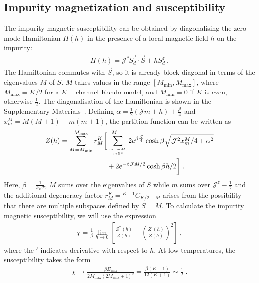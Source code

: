 \documentclass{iopart}
\begin{document}
\subsection{Impurity magnetization and susceptibility}
\label{sec:imp_suscept}
The impurity magnetic susceptibility can be obtained by diagonalising the zero-mode Hamiltonian \(H(h)\) in the presence of a local magnetic field \(h\) on the impurity:
\begin{eqnarray}
	\label{star graph_field_hamiltonian}
	H(h) = {\mathcal{J}^*} \vec{S_d}\cdot\vec{S} + h S_d^z~.
\end{eqnarray}
The Hamiltonian commutes with \(\vec S\), so it is already block-diagonal in terms of the eigenvalues \(M\) of \(S\). \(M\) takes values in the range \(\left[M_\mathrm{min}, M_\mathrm{max}\right]\), where \(M_\mathrm{max} = K/2\) for a \(K-\)channel Kondo model, and \(M_\mathrm{min} = 0\)  if \(K\) is even, otherwise \(\frac{1}{2}\). The diagonalisation of the Hamiltonian is shown in the Supplementary Materials~\cite{SM}. Defining \(\alpha = \frac{1}{2}\left({\mathcal{J}}m + h\right) + \frac{{\mathcal{J}}}{4}\) and \(x^M_m = M(M+1) - m(m+1)\), the partition function can be written as
\begin{eqnarray}
	Z(h) =\sum_{M=M_\mathrm{min}}^{M_\mathrm{max}}r^K_M\bigg[&\sum_{m=-M, \atop{m\in \mathbb{Z}}}^{M-1}2e^{\beta \frac{{\mathcal{J}}}{4}}\cosh \beta\sqrt{{\mathcal{J}}^2x^M_m/4 + \alpha^2} \nonumber\\
& + 2e^{-\beta {\mathcal{J}}M/2}\cosh \beta h/2\bigg]~.
\end{eqnarray}
Here, \(\beta = \frac{1}{k_B T}\), \(M\) sums over the eigenvalues of \(S\) while \(m\) sums over \({\mathcal{J}}^z - \frac{1}{2}\) and the additional degeneracy factor \(r^K_M= {}^{K-1}C_{K/2 - M}\) arises from the possibility that there are multiple subspaces defined by \(S=M\). 
To calculate the impurity magnetic susceptibility, we will use the expression
\begin{eqnarray}
	\chi = \frac{1}{\beta}\lim_{h \to 0}\left[\frac{Z^{\prime\prime}(h)}{Z(h)} - \left(\frac{Z^{\prime}(h)}{Z(h)}\right)^2 \right] ~,
\end{eqnarray}
where the \(\prime\) indicates derivative with respect to \(h\). At low temperatures, the susceptibility takes the form
\begin{eqnarray}
	\chi \to \frac{\beta\Sigma_\mathrm{max}}{2M_\mathrm{max}\left(2M_\mathrm{max}+1\right)^2} = \frac{\beta(K-1)}{12(K+1)} \sim \frac{1}{T}~.
\end{eqnarray}
\end{document}
